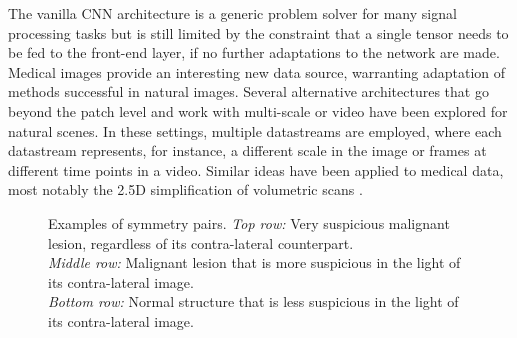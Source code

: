 \documentclass[12pt]{spieman}  %
\begin{document}
The vanilla CNN architecture is a generic problem solver for many signal processing tasks but is still limited by the constraint that a single tensor needs to be fed to the front-end layer, if no further adaptations to the network are made. Medical images provide an interesting new data source, warranting adaptation of methods successful in natural images. Several alternative architectures that go beyond the patch level and work with multi-scale \cite{Fara13a} or video \cite{Karp14, Neve14, Simo14a} have been explored for natural scenes. In these settings, multiple datastreams are employed, where each datastream represents, for instance, a different scale in the image or frames at different time points in a video. Similar ideas have been applied to medical data, most notably the 2.5D simplification of volumetric scans \cite{Pras13a, Roth14, Roth16}. \\

\begin{figure}
  \centering
  \hspace{0.5cm}

  \hspace{0.5cm}
  
  \hspace{0.5cm}

  \caption{Examples of symmetry pairs. {\it Top row:} Very suspicious malignant lesion, regardless of its contra-lateral counterpart. \\
  {\it Middle row:} Malignant lesion that is more suspicious in the light of its contra-lateral image. \\
  {\it Bottom row:} Normal structure that is less suspicious in the light of its contra-lateral image. }
  \label{fig::symmetry_pair_examples}
\end{figure}
\end{document}
